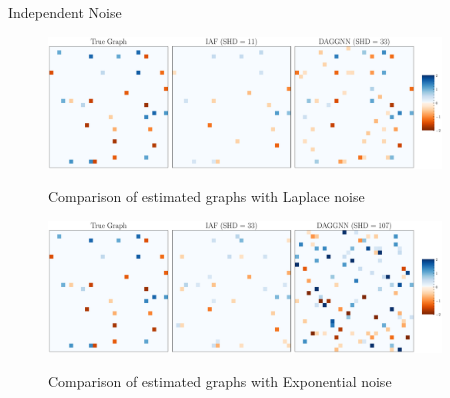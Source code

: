 \documentclass{beamer}
\begin{document}
\begin{frame}[allowframebreaks]{Independent Noise}
    \begin{figure}
        \centering
        \includegraphics[height=3.5cm]{fig/comparison_indep_30_laplace_seed301.pdf}
        \label{fig:ind_exponential_comparison}
        \captionsetup{justification=centering}
        \caption{Comparison of estimated graphs with Laplace noise}
    \end{figure}
    \begin{figure}
        \centering
        \includegraphics[height=3.5cm]{fig/comparison_indep_30_exponential_seed301.pdf}
        \label{fig:ind_exponential_comparison}
        \captionsetup{justification=centering}
        \caption{Comparison of estimated graphs with Exponential noise}
    \end{figure}
\end{frame}
\end{document}
